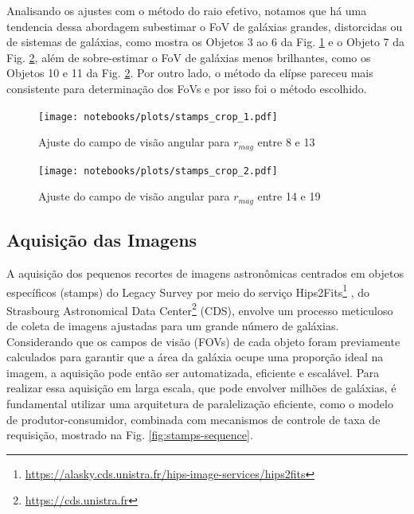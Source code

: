 Analisando os ajustes com o método do raio efetivo, notamos que há uma tendencia dessa abordagem subestimar o FoV de galáxias grandes, distorcidas ou de sistemas de galáxias, como mostra os Objetos 3 ao 6 da Fig. \ref{fig:fov-stamps-1} e o Objeto 7 da Fig. \ref{fig:fov-stamps-2}, além de sobre-estimar o FoV de galáxias menos brilhantes, como os Objetos 10 e 11 da Fig. \ref{fig:fov-stamps-2}. Por outro lado, o método da elípse pareceu mais consistente para determinação dos FoVs e por isso foi o método escolhido.

\begin{figure}[!ht]
  \centering
  \caption{Ajuste do campo de visão angular para $r_{mag}$ entre 8 e 13}
  \label{fig:fov-stamps-1}
  \texttt{[image: notebooks/plots/stamps\_crop\_1.pdf]}
\end{figure}

\begin{figure}[!ht]
  \centering
  \caption{Ajuste do campo de visão angular para $r_{mag}$ entre 14 e 19}
  \label{fig:fov-stamps-2}
  \texttt{[image: notebooks/plots/stamps\_crop\_2.pdf]}
\end{figure}








\subsection{Aquisição das Imagens}
\label{sec:aquisicao-stamps}

A aquisição dos pequenos recortes de imagens astronômicas centrados em objetos específicos (stamps) do Legacy Survey por meio do serviço Hips2Fits\footnote{\url{https://alasky.cds.unistra.fr/hips-image-services/hips2fits}} \cite{aladin}, do Strasbourg Astronomical Data Center\footnote{\url{https://cds.unistra.fr}} (CDS), envolve um processo meticuloso de coleta de imagens ajustadas para um grande número de galáxias. Considerando que os campos de visão (FOVs) de cada objeto foram previamente calculados para garantir que a área da galáxia ocupe uma proporção ideal na imagem, a aquisição pode então ser automatizada, eficiente e escalável. Para realizar essa aquisição em larga escala, que pode envolver milhões de galáxias, é fundamental utilizar uma arquitetura de paralelização eficiente, como o modelo de produtor-consumidor, combinada com mecanismos de controle de taxa de requisição, mostrado na Fig. \ref{fig:stamps-sequence}.

